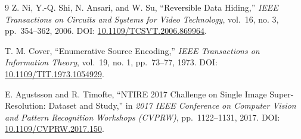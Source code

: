 \documentclass[
  11pt,
  a4paper,
]{article}
\begin{document}
\begin{thebibliography}{9}
 Z. Ni, Y.-Q. Shi, N. Ansari, and W. Su, ``Reversible Data
Hiding,'' \emph{IEEE Transactions on Circuits and Systems for Video
Technology}, vol.~16, no. 3, pp.~354--362, 2006. DOI:
\href{https://doi.org/10.1109/TCSVT.2006.869964}{10.1109/TCSVT.2006.869964}.

 T. M. Cover, ``Enumerative Source Encoding,'' \emph{IEEE
Transactions on Information Theory}, vol.~19, no. 1, pp.~73--77, 1973.
DOI:
\href{https://doi.org/10.1109/TIT.1973.1054929}{10.1109/TIT.1973.1054929}.

 E. Agustsson and R. Timofte, ``NTIRE 2017 Challenge on Single
Image Super-Resolution: Dataset and Study,'' in \emph{2017 IEEE
Conference on Computer Vision and Pattern Recognition Workshops
(CVPRW)}, pp.~1122--1131, 2017. DOI:
\href{https://doi.org/10.1109/CVPRW.2017.150}{10.1109/CVPRW.2017.150}.

\end{thebibliography}
\end{document}
